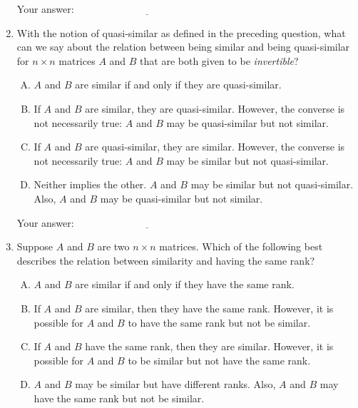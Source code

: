 \documentclass[10pt]{amsart}
\begin{document}
\begin{enumerate}
  \vspace{0.1in}
  Your answer: $\underline{\qquad\qquad\qquad\qquad\qquad\qquad\qquad}$
  \vspace{0.1in}

\item With the notion of quasi-similar as defined in the preceding
  question, what can we say about the relation between being similar
  and being quasi-similar for $n \times n$ matrices $A$ and $B$ that
  are both given to be {\em invertible}?

  \begin{enumerate}[(A)]
  \item $A$ and $B$ are similar if and only if they are quasi-similar.
  \item If $A$ and $B$ are similar, they are quasi-similar. However,
    the converse is not necessarily true: $A$ and $B$ may be
    quasi-similar but not similar.
  \item If $A$ and $B$ are quasi-similar, they are similar. However,
    the converse is not necessarily true: $A$ and $B$ may be similar
    but not quasi-similar.
  \item Neither implies the other. $A$ and $B$ may be similar but not
    quasi-similar. Also, $A$ and $B$ may be quasi-similar but not
    similar.
  \end{enumerate}

  \vspace{0.1in}
  Your answer: $\underline{\qquad\qquad\qquad\qquad\qquad\qquad\qquad}$
  \vspace{0.1in}

\item Suppose $A$ and $B$ are two $n \times n$ matrices. Which of the
  following best describes the relation between similarity and having
  the same rank?

  \begin{enumerate}[(A)]
  \item $A$ and $B$ are similar if and only if they have the same rank.
  \item If $A$ and $B$ are similar, then they have the same
    rank. However, it is possible for $A$ and $B$ to have the same
    rank but not be similar.
  \item If $A$ and $B$ have the same rank, then they are
    similar. However, it is possible for $A$ and $B$ to be similar but
    not have the same rank.
  \item $A$ and $B$ may be similar but have different ranks. Also, $A$
    and $B$ may have the same rank but not be similar.
  \end{enumerate}


\end{enumerate}
\end{document}
